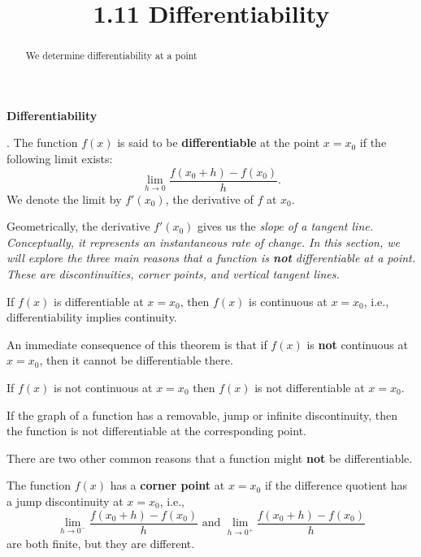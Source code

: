 \documentclass[handout]{ximera}
\title{1.11 Differentiability}
\begin{document}
\begin{abstract}
We determine differentiability at a point
\end{abstract}

\maketitle

\begin{center}
\textbf{Differentiability}
\end{center}


\begin{definition}[Differentiability].  The function $f(x)$ is said to be 
\textbf{differentiable} at the point $x= x_0$
if the following limit exists:
\[
\lim_{h\to 0} \frac{f(x_0+h) -f(x_0)}{h}.
\]
We denote the limit by $f'(x_0)$, the derivative of $f$ at $x_0$.

\end{definition}

Geometrically, the derivative $f'(x_0)$ gives us the \it{slope} of a tangent line.  
Conceptually, it represents an \it{instantaneous} rate of change.
In this section, we will explore the three main reasons that a function is \textbf{not} differentiable at a point. These are
discontinuities, corner points, and vertical tangent lines.

\begin{theorem}
If $f(x)$ is differentiable at $x = x_0$, then $f(x)$ is continuous at $x=x_0$, i.e.,
differentiability implies continuity.
\end{theorem}

An immediate consequence of this theorem is that if $f(x)$ is \textbf{not} continuous at $x = x_0$,
then it cannot be differentiable there.  

\begin{corollary}
If $f(x)$ is not continuous at $x = x_0$ then $f(x)$ is not differentiable at $x = x_0$.
\end{corollary}

If the graph of a function has a removable, jump or infinite discontinuity, 
then the function is not differentiable at the corresponding point.

There are two other common reasons that a function might \textbf{not} be differentiable.

\begin{definition} The function $f(x)$ has a \textbf{corner point} at $x = x_0$ if
the difference quotient has a jump discontinuity at $x = x_0$, i.e.,
\[
\lim_{h\to 0^-} \frac{f(x_0 +h)-f(x_0)}{h} \text{  and  }  \lim_{h\to 0^+} \frac{f(x_0 +h)-f(x_0)}{h}
\]
are both finite, but they are different.

\end{definition}
\end{document}
